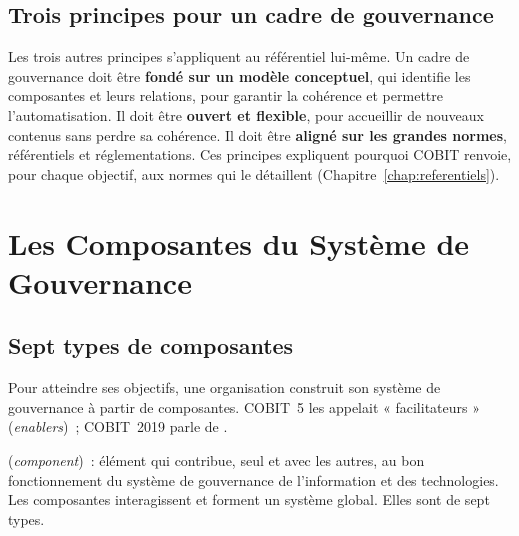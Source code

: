 \subsection{Trois principes pour un cadre de gouvernance}

Les trois autres principes s'appliquent au référentiel lui-même. Un cadre
de gouvernance doit être \textbf{fondé sur un modèle conceptuel}, qui
identifie les composantes et leurs relations, pour garantir la cohérence
et permettre l'automatisation. Il doit être \textbf{ouvert et flexible},
pour accueillir de nouveaux contenus sans perdre sa cohérence. Il doit
être \textbf{aligné sur les grandes normes}, référentiels et
réglementations. Ces principes expliquent pourquoi COBIT renvoie, pour
chaque objectif, aux normes qui le détaillent (Chapitre~\ref{chap:referentiels}).

\section{Les Composantes du Système de Gouvernance}
\label{sec:c05-composantes}

\subsection{Sept types de composantes}

Pour atteindre ses objectifs, une organisation construit son système de
gouvernance à partir de composantes. COBIT~5 les appelait
« facilitateurs » (\textit{enablers})~; COBIT~2019 parle de
.

\begin{boxdef}
 (\textit{component})~: élément qui
contribue, seul et avec les autres, au bon fonctionnement du système de
gouvernance de l'information et des technologies. Les composantes
interagissent et forment un système global. Elles sont de sept types.
\end{boxdef}

